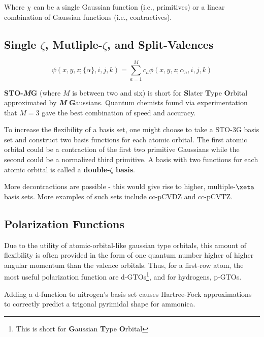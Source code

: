 \documentclass[
  letterpaper,
  DIV=11,
  numbers=noendperiod]{scrreprt}
\begin{document}
Where \(\chi\) can be a single Gaussian function (i.e., primitives) or a
linear combination of Gaussian functions (i.e., contractives).

\hypertarget{single-zeta-mutliple-zeta-and-split-valences}{%
\subsection{\texorpdfstring{Single \(\zeta\), Mutliple-\(\zeta\), and
Split-Valences}{Single \textbackslash zeta, Mutliple-\textbackslash zeta, and Split-Valences}}\label{single-zeta-mutliple-zeta-and-split-valences}}

\begin{equation}
  \psi(x, y, z; \{\alpha\}, i, j, k) = \sum_{a = 1}^Mc_a\phi(x, y, z; \alpha_a, i, j, k)
\end{equation}

\textbf{STO-\emph{M}G} (where \(M\) is between two and six) is short for
\textbf{S}later \textbf{T}ype \textbf{O}rbital approximated by
\textbf{\emph{M}} \textbf{G}aussians. Quantum chemists found via
experimentation that \(M = 3\) gave the best combination of speed and
accuracy.

To increase the flexibility of a basis set, one might choose to take a
STO-3G basis set and construct two basis functions for each atomic
orbital. The first atomic orbital could be a contraction of the first
two primitive Gaussians while the second could be a normalized third
primitive. A basis with two functions for each atomic orbital is called
a \textbf{double-\(\zeta\) basis}.

More decontractions are possible - this would give rise to higher,
multiple-\(\xeta\) basis sets. More examples of such sets include
cc-pCVDZ and cc-pCVTZ.

\hypertarget{polarization-functions}{%
\subsection{Polarization Functions}\label{polarization-functions}}

Due to the utility of atomic-orbital-like gaussian type orbitals, this
amount of flexibility is often provided in the form of one quantum
number higher of higher angular momentum than the valence orbitals.
Thus, for a first-row atom, the most useful polarization function are
d-GTOs\footnote{This is short for \textbf{G}aussian \textbf{T}ype
  \textbf{O}rbital}, and for hydrogens, p-GTOs.

Adding a d-function to nitrogen's basis set causes Hartree-Fock
approximations to correctly predict a trigonal pyrimidal shape for
ammonica.
\end{document}
